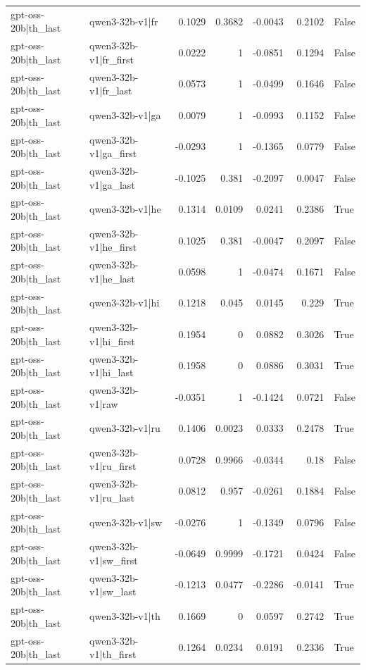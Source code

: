 \begin{table}
\begin{tabular}{l l r r r r l}
gpt-oss-20b|th_last & qwen3-32b-v1|fr & 0.1029 & 0.3682 & -0.0043 & 0.2102 & False \\
gpt-oss-20b|th_last & qwen3-32b-v1|fr_first & 0.0222 & 1 & -0.0851 & 0.1294 & False \\
gpt-oss-20b|th_last & qwen3-32b-v1|fr_last & 0.0573 & 1 & -0.0499 & 0.1646 & False \\
gpt-oss-20b|th_last & qwen3-32b-v1|ga & 0.0079 & 1 & -0.0993 & 0.1152 & False \\
gpt-oss-20b|th_last & qwen3-32b-v1|ga_first & -0.0293 & 1 & -0.1365 & 0.0779 & False \\
gpt-oss-20b|th_last & qwen3-32b-v1|ga_last & -0.1025 & 0.381 & -0.2097 & 0.0047 & False \\
gpt-oss-20b|th_last & qwen3-32b-v1|he & 0.1314 & 0.0109 & 0.0241 & 0.2386 & True \\
gpt-oss-20b|th_last & qwen3-32b-v1|he_first & 0.1025 & 0.381 & -0.0047 & 0.2097 & False \\
gpt-oss-20b|th_last & qwen3-32b-v1|he_last & 0.0598 & 1 & -0.0474 & 0.1671 & False \\
gpt-oss-20b|th_last & qwen3-32b-v1|hi & 0.1218 & 0.045 & 0.0145 & 0.229 & True \\
gpt-oss-20b|th_last & qwen3-32b-v1|hi_first & 0.1954 & 0 & 0.0882 & 0.3026 & True \\
gpt-oss-20b|th_last & qwen3-32b-v1|hi_last & 0.1958 & 0 & 0.0886 & 0.3031 & True \\
gpt-oss-20b|th_last & qwen3-32b-v1|raw & -0.0351 & 1 & -0.1424 & 0.0721 & False \\
gpt-oss-20b|th_last & qwen3-32b-v1|ru & 0.1406 & 0.0023 & 0.0333 & 0.2478 & True \\
gpt-oss-20b|th_last & qwen3-32b-v1|ru_first & 0.0728 & 0.9966 & -0.0344 & 0.18 & False \\
gpt-oss-20b|th_last & qwen3-32b-v1|ru_last & 0.0812 & 0.957 & -0.0261 & 0.1884 & False \\
gpt-oss-20b|th_last & qwen3-32b-v1|sw & -0.0276 & 1 & -0.1349 & 0.0796 & False \\
gpt-oss-20b|th_last & qwen3-32b-v1|sw_first & -0.0649 & 0.9999 & -0.1721 & 0.0424 & False \\
gpt-oss-20b|th_last & qwen3-32b-v1|sw_last & -0.1213 & 0.0477 & -0.2286 & -0.0141 & True \\
gpt-oss-20b|th_last & qwen3-32b-v1|th & 0.1669 & 0 & 0.0597 & 0.2742 & True \\
gpt-oss-20b|th_last & qwen3-32b-v1|th_first & 0.1264 & 0.0234 & 0.0191 & 0.2336 & True \\

\end{tabular}
\end{table}
